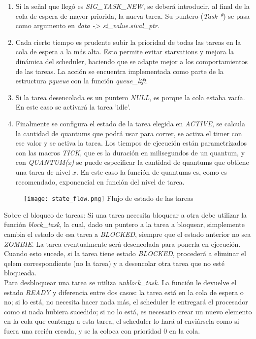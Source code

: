 \documentclass[a4paper]{article}
\begin{document}
\begin{enumerate}
    tiene que ser porque se encuentra esperando I/O, un lock, o que
    alguna otra condición se cumpla para seguir su ejecución,
    entonces se deja a la tarea en su prioridad actual.
    \item Si la señal que llegó es \textit{SIG\_TASK\_NEW}, se deberá
    introducir, al final de la cola de espera de mayor priorida, la
    nueva tarea. Su puntero (\textit{Task *}) se pasa como argumento
    en \textit{data -> si\_value.sival\_ptr}.
    \item Cada cierto tiempo es prudente subir la prioridad de todas
    las tareas en la cola de espera a la más alta. Esto permite
    evitar starvations y mejora la dinámica del scheduler, haciendo
    que se adapte mejor a los comportamientos de las tareas. La
    acción se encuentra implementada como parte de la estructura
    \textit{pqueue} con la función \textit{queue\_lift}.
    \item Si la tarea desencolada es un puntero \textit{NULL}, es porque
    la cola estaba vac\'ia. En este caso se activar\'a la tarea 'idle'.
    \item Finalmente se configura el estado de la tarea elegida en
    \textit{ACTIVE}, se calcula la cantidad de quantums que podrá
    usar para correr, se activa el timer con ese valor y se activa
    la tarea. Los tiempos de ejecución están parametrizados con
    las macros \textit{TICK}, que es la duración en milisegundos
    de un quantum, y con \textit{QUANTUM(x)} se puede especificar
    la cantidad de quantums que obtiene una tarea de nivel $x$.
    En este caso la función de quantums es, como es recomendado,
    exponencial en función del nivel de tarea.
\end{enumerate}

\begin{figure}[H]
    \begin{center}
        \texttt{[image: state\_flow.png]}
        Flujo de estado de las tareas
    \end{center}
\end{figure}

Sobre el bloqueo de tareas: Si una tarea necesita bloquear a otra
debe utilizar la función \textit{block\_task}, la cual, dado un
puntero a la tarea a bloquear, simplemente cambia el estado de esa
tarea a \textit{BLOCKED}, siempre que el estado anterior no sea
\textit{ZOMBIE}. La tarea eventualmente ser\'a desencolada para ponerla
en ejecuci\'on. Cuando esto sucede, si la tarea tiene estado
\textit{BLOCKED}, procederá a eliminar el qelem correspondiente
(no la tarea) y a desencolar otra tarea que no esté bloqueada.\\
Para desbloquear una tarea se utiliza \textit{unblock\_task}.
La función le devuelve el estado
\textit{READY} y diferencia entre dos casos: la tarea está en la
cola de espera o no; si lo está, no necesita hacer nada más, el
scheduler le entregará el procesador como si nada hubiera
sucedido; si no lo está, es necesario crear un nuevo elemento
en la cola que contenga a esta tarea, el scheduler lo hará al
enviársela como si fuera una recién creada, y se la coloca con
prioridad 0 en la cola.
\end{document}
